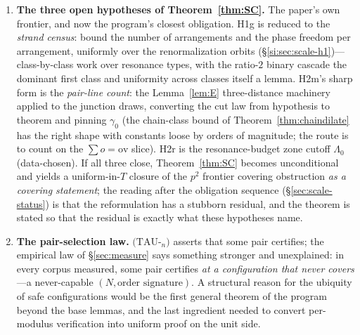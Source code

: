 \documentclass[11pt,a4paper]{article}
\numberwithin{equation}{section}
\theoremstyle{plain}
\theoremstyle{plain}
\theoremstyle{definition}
\theoremstyle{remark}
\begin{document}
\begin{enumerate}[leftmargin=1.7em,itemsep=4pt]

\item \textbf{The three open hypotheses of Theorem~\ref{thm:SC}.} The paper's
  own frontier, and now the program's closest obligation. H1g is reduced
  to the \emph{strand census}: bound the number of arrangements and the
  phase freedom per arrangement, uniformly over the renormalization
  orbits (\S\ref{si:sec:scale-h1})---class-by-class work over resonance
  types, with the ratio-$2$ binary cascade the dominant first class and
  uniformity across classes itself a lemma. H2m's sharp form is the
  \emph{pair-line count}: the Lemma~\ref{lem:E} three-distance
  machinery applied to the junction draws, converting the cut law from
  hypothesis to theorem and pinning $\gamma_0$ (the chain-class bound of
  Theorem~\ref{thm:chaindilate} has the right shape with constants loose
  by orders of magnitude; the route is to count on the
  $\sum o=\mathrm{ov}$ slice). H2r is the resonance-budget zone cutoff
  $\Lambda_0$ (data-chosen). If all three close, Theorem~\ref{thm:SC}
  becomes unconditional and yields a uniform-in-$T$ closure of the $p^2$
  frontier covering obstruction \emph{as a covering statement}; the
  reading after the obligation sequence
  (\S\ref{sec:scale-status}) is that the reformulation has a stubborn
  residual, and the theorem is stated so that the residual is exactly
  what these hypotheses name.

\item \textbf{The pair-selection law.} $(\mathrm{TAU}$-$_n)$ asserts that
  some pair certifies; the empirical law of \S\ref{sec:measure} says
  something stronger and unexplained: in every corpus measured, some pair
  certifies \emph{at a configuration that never covers}---a never-capable
  $(N,\text{order signature})$. A structural reason for the ubiquity of
  safe configurations would be the first general theorem of the program
  beyond the base lemmas, and the last ingredient needed to convert
  per-modulus verification into uniform proof on the unit side.


\end{enumerate}
\end{document}
